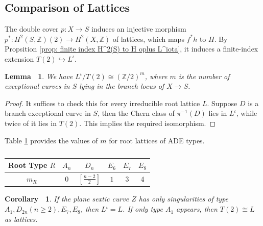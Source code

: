 \documentclass[12pt,reqno,a4paper]{amsart}
\newtheorem{lem}[thm]{Lemma~}
\newtheorem{cor}[thm]{Corollary~}
\theoremstyle{remark}
\theoremstyle{definition}
\newcommand{\ZZ}{\mathbb{Z}}
\begin{document}
\subsection{Comparison of Lattices}
The double cover $p\colon X\to S$ induces an injective morphism $p^*\colon H^2(S,\ZZ)(2)\to H^2(X,\ZZ)$ of lattices, which maps $f^* h$ to $H$. By Propsition \ref{prop: finite index H^2(S) to H oplus L^iota}, it induces a finite-index extension $T(2)\hookrightarrow L^{\iota}$. 
\begin{lem}
\label{lem: T_F and L_F}
We have $L^{\iota}/T(2)\cong (\ZZ/2)^m$, where $m$ is the number of exceptional curves in $S$ lying in the branch locus of $X\to S$.
\end{lem}
\begin{proof}
It suffices to check this for every irreducible root lattice $L$. Suppose $D$ is a branch exceptional curve in $S$, then the Chern class of $\pi^{-1}(D)$ lies in $L^\iota$, while twice of it lies in $T(2)$. This implies the required isomorphism.
\end{proof}

Table \ref{table: m_R} provides the values of $m$ for root lattices of ADE types.

\begin{table}[htbp]  %
  \centering  %
  \caption{}  %
  \begin{tabular}{cccccc}
  \toprule
  Root Type $R$ & $A_n$ & $D_n$ & $E_6$ & $E_7$ & $E_8$ \\  %
  \midrule
  $m_R$ & $0$ & $[\frac{n-2}{2}]$ & $1$ & $3$ & $4$ \\  %
  \bottomrule
  \end{tabular}
  \label{table: m_R}  %
\end{table}

\begin{cor}
\label{cor: if only A_1,D_2n,E_7,E_8}
    If the plane sextic curve $Z$ has only singularities of type $A_1,D_{2n}(n\ge 2),E_7,E_8$, then $L^\iota=L$. If only type $A_1$ appears, then $T(2)\cong L$ as lattices.
\end{cor}

\end{document}
